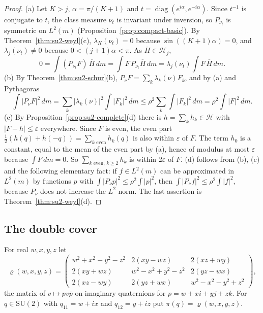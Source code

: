 \documentclass[11pt]{amsart}
\theoremstyle{definition}
\theoremstyle{remark}
\begin{document}
\begin{proof}
(a) Let $K>j$, $\alpha=\pi/(K+1)$ and $t=\operatorname{diag}(e^{i\alpha},e^{-i\alpha})$.  Since
$t^{-1}$ is conjugate to $t$, the class measure $\nu_t$ is invariant under inversion, so
$P_{\nu_t}$ is symmetric on $L^2(m)$ (Proposition~\ref{prop:compact-basic}).  By
Theorem~\ref{thm:su2-weyl}(c), $\lambda_K(\nu_t)=0$ because $\sin((K+1)\alpha)=0$, and
$\lambda_j(\nu_t)\ne0$ because $0<(j+1)\alpha<\pi$.  As $\overline H\in\mathcal H_j$,
\[
  0=\int(P_{\nu_t}F)\,\overline H\,dm=\int F\,P_{\nu_t}\overline H\,dm
  =\lambda_j(\nu_t)\int F\,\overline H\,dm .
\]
(b) By Theorem~\ref{thm:su2-schur}(b), $P_\nu F=\sum_k\lambda_k(\nu)F_k$, and by (a) and
Pythagoras
\[
  \int|P_\nu F|^2\,dm=\sum_k|\lambda_k(\nu)|^2\int|F_k|^2\,dm\le\rho^2\sum_k\int|F_k|^2\,dm
  =\rho^2\int|F|^2\,dm .
\]
(c) By
Proposition~\ref{prop:su2-complete}(d) there is $h=\sum_kh_k\in\mathcal H$ with
$|F-h|\le\varepsilon$ everywhere.  Since $F$ is even, the even part
$\tfrac12(h(q)+h(-q))=\sum_{k\text{ even}}h_k(q)$ is also within $\varepsilon$ of $F$.  The term
$h_0$ is a constant, equal to the mean of the even part by (a), hence of modulus at most
$\varepsilon$ because $\int F\,dm=0$.  So $\sum_{k\text{ even},\,k\ge2}h_k$ is within
$2\varepsilon$ of $F$.  (d) follows from (b), (c) and the following elementary fact: if
$f\in L^2(m)$ can be approximated in $L^2(m)$ by functions $p$ with
$\int|P_\nu p|^2\le\rho^2\int|p|^2$, then $\int|P_\nu f|^2\le\rho^2\int|f|^2$, because $P_\nu$
does not increase the $L^2$ norm.  The last assertion is Theorem~\ref{thm:su2-weyl}(d).
\end{proof}

\subsection{The double cover}\label{sec:cover}
For real $w,x,y,z$ let
\[
  \varrho(w,x,y,z)=\begin{pmatrix}
  w^2+x^2-y^2-z^2&2(xy-wz)&2(xz+wy)\\
  2(xy+wz)&w^2-x^2+y^2-z^2&2(yz-wx)\\
  2(xz-wy)&2(yz+wx)&w^2-x^2-y^2+z^2\end{pmatrix},
\]
the matrix of $v\mapsto pv\bar p$ on imaginary quaternions for $p=w+xi+yj+zk$.  For
$q\in\mathrm{SU}(2)$ with $q_{11}=w+ix$ and $q_{12}=y+iz$ put $\pi(q)=\varrho(w,x,y,z)$.
\end{document}

